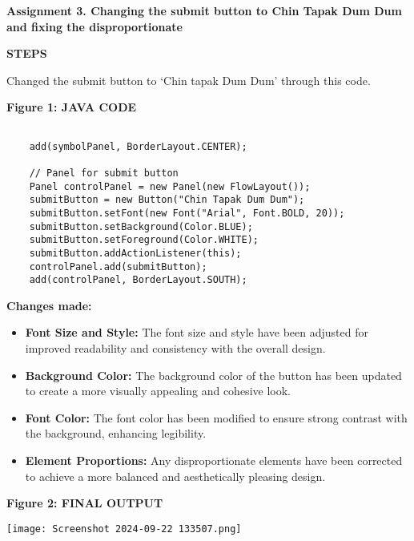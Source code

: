 \documentclass[a4paper,14pt]{article}
\begin{document}
\vspace{15pt}

\noindent\textbf{Assignment 3. Changing the submit button to Chin Tapak Dum Dum and fixing the disproportionate}

\vspace{15pt}
\begin{center}
\noindent\textbf{STEPS}

\vspace{15pt}

\noindent Changed the submit button to `Chin tapak Dum Dum' through this code.
\end{center}
\vspace{25pt}

\noindent\textbf{Figure 1: JAVA CODE}

\begin{verbatim}
    
    add(symbolPanel, BorderLayout.CENTER);
    
    // Panel for submit button
    Panel controlPanel = new Panel(new FlowLayout());
    submitButton = new Button("Chin Tapak Dum Dum");
    submitButton.setFont(new Font("Arial", Font.BOLD, 20));
    submitButton.setBackground(Color.BLUE);
    submitButton.setForeground(Color.WHITE);
    submitButton.addActionListener(this);
    controlPanel.add(submitButton);
    add(controlPanel, BorderLayout.SOUTH);

\end{verbatim}


\vspace{15pt}

\noindent\textbf{Changes made:}
\begin{itemize}[leftmargin=*]
    \item \textbf{Font Size and Style:} The font size and style have been adjusted for improved readability and consistency with the overall design.
    \item \textbf{Background Color:} The background color of the button has been updated to create a more visually appealing and cohesive look.
    \item \textbf{Font Color:} The font color has been modified to ensure strong contrast with the background, enhancing legibility.
    \item \textbf{Element Proportions:} Any disproportionate elements have been corrected to achieve a more balanced and aesthetically pleasing design.
\end{itemize}

\vspace{230pt}

\begin{center}
\noindent\textbf{Figure 2: FINAL OUTPUT}
\end{center}
\vspace{10pt}

\begin{center}
\texttt{[image: Screenshot 2024-09-22 133507.png]} \\[5pt]
\end{center}
\end{document}
